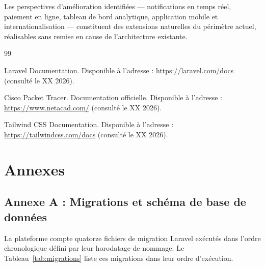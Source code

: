 \documentclass[12pt,a4paper]{report}
\begin{document}
Les perspectives d'amélioration identifiées --- notifications en temps réel,
paiement en ligne, tableau de bord analytique, application mobile et
internationalisation --- constituent des extensions naturelles du périmètre
actuel, réalisables sans remise en cause de l'architecture existante.


\begin{thebibliography}{99}

     Laravel Documentation. Disponible à l'adresse :
    \url{https://laravel.com/docs} (consulté le XX 2026).

     Cisco Packet Tracer. Documentation officielle.
    Disponible à l'adresse : \url{https://www.netacad.com/} (consulté le
    XX 2026).

     Tailwind CSS Documentation. Disponible à l'adresse :
    \url{https://tailwindcss.com/docs} (consulté le XX 2026).

\end{thebibliography}


\appendix

\chapter*{Annexes}

\section*{Annexe A : Migrations et schéma de base de données}

La plateforme compte quatorze fichiers de migration Laravel exécutés dans
l'ordre chronologique défini par leur horodatage de nommage. Le
Tableau~\ref{tab:migrations} liste ces migrations dans leur ordre
d'exécution.
\end{document}
